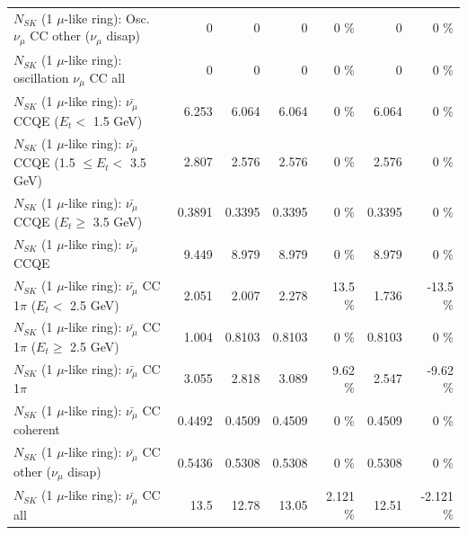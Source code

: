 \begin{table}
\begin{tabular}{| l | r | r | r  r | r  r |}
         $N_{SK}$ (1 $\mu$-like ring): Osc. $\nu_\mu$ CC other ($\nu_\mu$ disap) &               0 &               0 &               0 &        0 \%  &               0 &        0 \%  \\ 
                      $N_{SK}$ (1 $\mu$-like ring): oscillation $\nu_\mu$ CC all &               0 &               0 &               0 &        0 \%  &               0 &        0 \%  \\ 
\hline
\hline
          $N_{SK}$ (1 $\mu$-like ring): $\bar{\nu_\mu}$ CCQE ($E_{t} <$ 1.5 GeV) &           6.253 &           6.064 &           6.064 &        0 \%  &           6.064 &        0 \%  \\ 
 $N_{SK}$ (1 $\mu$-like ring): $\bar{\nu_\mu}$ CCQE (1.5 $\leq E_{t} <$ 3.5 GeV) &           2.807 &           2.576 &           2.576 &        0 \%  &           2.576 &        0 \%  \\ 
       $N_{SK}$ (1 $\mu$-like ring): $\bar{\nu_\mu}$ CCQE ($E_{t} \geq$ 3.5 GeV) &          0.3891 &          0.3395 &          0.3395 &        0 \%  &          0.3395 &        0 \%  \\ 
\hline
                              $N_{SK}$ (1 $\mu$-like ring): $\bar{\nu_\mu}$ CCQE &           9.449 &           8.979 &           8.979 &        0 \%  &           8.979 &        0 \%  \\ 
\hline
     $N_{SK}$ (1 $\mu$-like ring): $\bar{\nu_\mu}$ CC 1$\pi$ ($E_{t} <$ 2.5 GeV) &           2.051 &           2.007 &           2.278 &     13.5 \%  &           1.736 &    -13.5 \%  \\ 
  $N_{SK}$ (1 $\mu$-like ring): $\bar{\nu_\mu}$ CC 1$\pi$ ($E_{t} \geq$ 2.5 GeV) &           1.004 &          0.8103 &          0.8103 &        0 \%  &          0.8103 &        0 \%  \\ 
\hline
                         $N_{SK}$ (1 $\mu$-like ring): $\bar{\nu_\mu}$ CC 1$\pi$ &           3.055 &           2.818 &           3.089 &     9.62 \%  &           2.547 &    -9.62 \%  \\ 
                       $N_{SK}$ (1 $\mu$-like ring): $\bar{\nu_\mu}$ CC coherent &          0.4492 &          0.4509 &          0.4509 &        0 \%  &          0.4509 &        0 \%  \\ 
        $N_{SK}$ (1 $\mu$-like ring): $\bar{\nu_\mu}$ CC other ($\nu_\mu$ disap) &          0.5436 &          0.5308 &          0.5308 &        0 \%  &          0.5308 &        0 \%  \\ 
                          $N_{SK}$ (1 $\mu$-like ring): $\bar{\nu_{\mu}}$ CC all &            13.5 &           12.78 &           13.05 &    2.121 \%  &           12.51 &   -2.121 \%  \\ 

\end{tabular}
\end{table}
